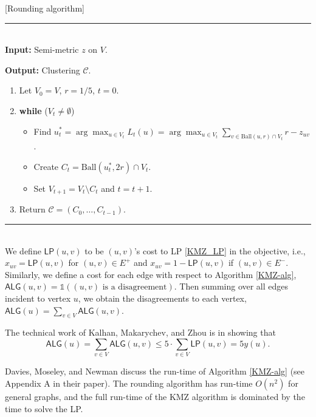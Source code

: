 \begin{algorithm} \label{KMZ-alg}[Rounding algorithm]
\end{algorithm}

\begin{minipage}{13cm}
\rule{12cm}{0.4pt}\\
\noindent \textbf{Input: }Semi-metric $z$ on $V$.

\noindent \textbf{Output: }Clustering $\mathcal{C}$.
\begin{enumerate}
    \item Let $V_0 = V$, $r = 1/5$, $t=0$.
    \item \textbf{while} ($V_t \neq \emptyset$)
    \begin{itemize}
        \item Find $u^*_t = \arg \max_{u \in V_t} L_t(u) =  \arg \max_{u \in V_t} \sum_{v \in \text{Ball}(u,r) \cap V_t} {r-z_{uv}}$. 
        \item Create ${C_t = \text{Ball}(u^*_t,2r) \cap V_t}$.
        \item Set $V_{t+1} = V_t \setminus C_t$ and $t=t+1$.
    \end{itemize}
    \item Return ${\mathcal{C} = (C_0, \dots, C_{t-1})}$.
\end{enumerate}
    \rule{12cm}{0.4pt}
\end{minipage}\\

We define $\textsf{LP}(u,v)$ to be $(u,v)$'s cost to LP \ref{KMZ_LP} in the objective, i.e., $x_{uv}=\textsf{LP}(u,v)$ for $(u,v) \in E^+$ and 
$x_{uv}=1-\textsf{LP}(u,v)$ if $(u,v) \in E^-$. 
Similarly, we define a cost for each edge with respect to 
Algorithm \ref{KMZ-alg},
$\textsf{ALG}(u,v) = \mathds{1}((u,v) \text { is a disagreement})$.
Then summing over all edges incident to vertex $u$, we obtain the disagreements to each vertex, $\textsf{ALG}(u) = \sum_{v \in V} \textsf{ALG}(u,v)$.

The technical work of Kalhan, Makarychev, and Zhou \citeyearpar{KMZ19} is in showing that 
\begin{equation}\label{eq: KMZ}
    \textsf{ALG}(u) = \sum_{v \in V}\textsf{ALG}(u,v) \leq 
5 \cdot \sum_{v \in V}\textsf{LP}(u,v) = 5 y(u).
\end{equation} 


Davies, Moseley, and Newman \citeyearpar{DMN23} discuss the run-time of Algorithm \ref{KMZ-alg} (see Appendix A in their paper).
The rounding algorithm has run-time $O(n^2)$ for general graphs, 
and the full run-time of the KMZ algorithm is dominated by the time to solve the LP.



